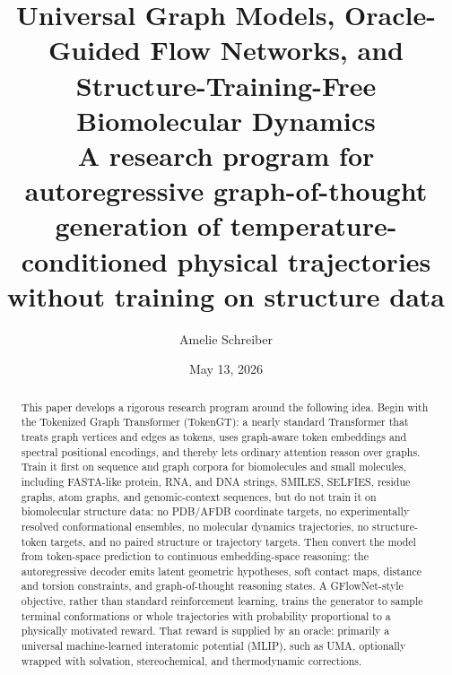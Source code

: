 \documentclass[11pt]{article}
\title{\textbf{Universal Graph Models, Oracle-Guided Flow Networks, and Structure-Training-Free Biomolecular Dynamics}\\
\large A research program for autoregressive graph-of-thought generation of temperature-conditioned physical trajectories without training on structure data}
\author{Amelie Schreiber}
\date{May 13, 2026}
\begin{document}
\maketitle

\begin{abstract}
This paper develops a rigorous research program around the following idea. Begin with the Tokenized Graph Transformer (TokenGT): a nearly standard Transformer that treats graph vertices and edges as tokens, uses graph-aware token embeddings and spectral positional encodings, and thereby lets ordinary attention reason over graphs. Train it first on sequence and graph corpora for biomolecules and small molecules, including FASTA-like protein, RNA, and DNA strings, SMILES, SELFIES, residue graphs, atom graphs, and genomic-context sequences, but do not train it on biomolecular structure data: no PDB/AFDB coordinate targets, no experimentally resolved conformational ensembles, no molecular dynamics trajectories, no structure-token targets, and no paired structure or trajectory targets. Then convert the model from token-space prediction to continuous embedding-space reasoning: the autoregressive decoder emits latent geometric hypotheses, soft contact maps, distance and torsion constraints, and graph-of-thought reasoning states. A GFlowNet-style objective, rather than standard reinforcement learning, trains the generator to sample terminal conformations or whole trajectories with probability proportional to a physically motivated reward. That reward is supplied by an oracle: primarily a universal machine-learned interatomic potential (MLIP), such as UMA, optionally wrapped with solvation, stereochemical, and thermodynamic corrections.


\end{abstract}
\end{document}
